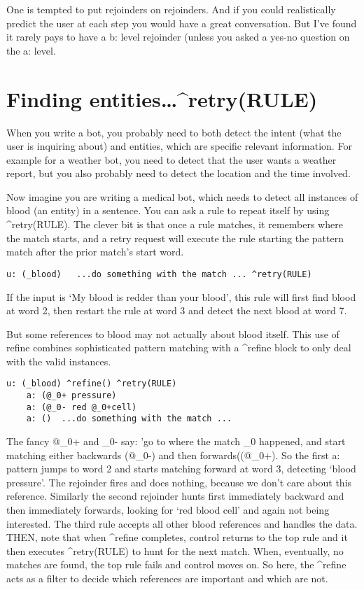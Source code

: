 \documentclass[]{article}
\begin{document}
One is tempted to put rejoinders on rejoinders. And if you could
realistically predict the user at each step you would have a great
conversation. But I've found it rarely pays to have a b: level rejoinder
(unless you asked a yes-no question on the a: level.

\section{Finding
entities\ldots{}\^{}retry(RULE)}\label{finding-entitiesretryrule}

When you write a bot, you probably need to both detect the intent (what
the user is inquiring about) and entities, which are specific relevant
information. For example for a weather bot, you need to detect that the
user wants a weather report, but you also probably need to detect the
location and the time involved.

Now imagine you are writing a medical bot, which needs to detect all
instances of blood (an entity) in a sentence. You can ask a rule to
repeat itself by using \^{}retry(RULE). The clever bit is that once a
rule matches, it remembers where the match starts, and a retry request
will execute the rule starting the pattern match after the prior match's
start word.

\begin{verbatim}
u: (_blood)   ...do something with the match ... ^retry(RULE)
\end{verbatim}

If the input is `My blood is redder than your blood', this rule will
first find blood at word 2, then restart the rule at word 3 and detect
the next blood at word 7.

But some references to blood may not actually about blood itself. This
use of refine combines sophisticated pattern matching with a \^{}refine
block to only deal with the valid instances.

\begin{verbatim}
u: (_blood) ^refine() ^retry(RULE)
    a: (@_0+ pressure) 
    a: (@_0- red @_0+cell)
    a: ()  ...do something with the match ...
\end{verbatim}

The fancy @\_0+ and \_0- say: 'go to where the match \_0 happened, and
start matching either backwards (@\_0-) and then forwards((@\_0+). So
the first a: pattern jumps to word 2 and starts matching forward at word
3, detecting `blood pressure'. The rejoinder fires and does nothing,
because we don't care about this reference. Similarly the second
rejoinder hunts first immediately backward and then immediately
forwards, looking for `red blood cell' and again not being interested.
The third rule accepts all other blood references and handles the data.
THEN, note that when \^{}refine completes, control returns to the top
rule and it then executes \^{}retry(RULE) to hunt for the next match.
When, eventually, no matches are found, the top rule fails and control
moves on. So here, the \^{}refine acts as a filter to decide which
references are important and which are not.
\end{document}
